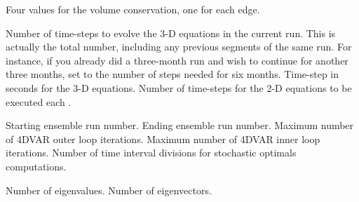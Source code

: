 \begin{klist}
\begin{klist}
\begin{klist}
         \end{klist}
        Four values for the volume conservation, one
for each edge.
     \end{klist}
    \mbox{}
     \begin{klist}
           Number of time-steps to evolve the 3-D
       equations in the current run.  This is actually the total
     number, including any previous segments of the same run.  For
     instance, if you already did a three-month run and wish to
     continue for another three months, set  to the
     number of steps needed for six months.
               Time-step in seconds for the 3-D equations.
          Number of time-steps for the 2-D equations
     to be executed each .
     \end{klist}
    \mbox{}
     \begin{klist}
        Starting ensemble run number.
        Ending ensemble run number.
        Maximum number of 4DVAR outer loop iterations.
        Maximum number of 4DVAR inner loop iterations.
        Number of time interval divisions for
       stochastic optimals computations.
     \end{klist}
    \mbox{}
     \begin{klist}
        Number of eigenvalues.
        Number of eigenvectors.
     \end{klist}
    \mbox{}


\end{klist}
